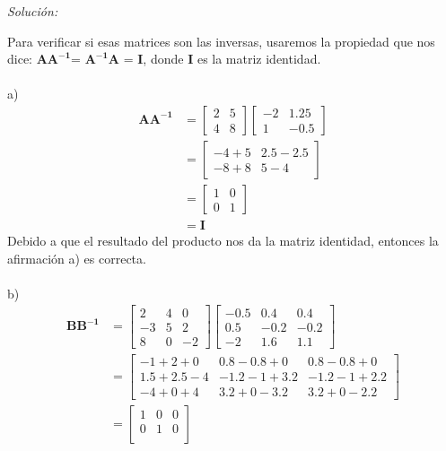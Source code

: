 \documentclass[12pt]{article}
\newenvironment{sol}
    {\emph{Solución:}
    }
    {
    }
\begin{document}
\begin{sol}
Para verificar si esas matrices son las inversas, usaremos la propiedad que nos dice:
$\mathbf{AA^{-1}}$= $\mathbf{A^{-1}A}$ = \textbf{I}, donde \textbf{I} es la matriz identidad.\\ \\
a) 
\begin{align*}
\mathbf{AA^{-1}} &= 
\begin{bmatrix} 
2 & 5 \\
4 & 8 
\end{bmatrix} 
\begin{bmatrix}
-2 & 1.25 \\ 
1 & -0.5
\end{bmatrix}\\
&= 
\begin{bmatrix}
-4 + 5 & 2.5 - 2.5 \\
-8 + 8 & 5 - 4
\end{bmatrix}\\
&= 
\begin{bmatrix}
1 & 0 \\
0 & 1
\end{bmatrix}\\
&= \mathbf{I}
\end{align*}
Debido a que el resultado del producto nos da la matriz identidad, entonces la afirmación a) es correcta. \\ \\ 
b)
\begin{align*}
\mathbf{BB^{-1}} &= 
\begin{bmatrix}
2&4&0\\
-3&5&2\\
8&0&-2
\end{bmatrix}
\begin{bmatrix}
-0.5 & 0.4 & 0.4\\
0.5 & -0.2 & -0.2\\
-2 & 1.6 & 1.1
\end{bmatrix} \\
&=
\begin{bmatrix}
-1 + 2 + 0 & 0.8 - 0.8 + 0 & 0.8 - 0.8 + 0 \\
1.5 + 2.5 - 4 & -1.2 - 1 + 3.2 & -1.2 - 1 + 2.2 \\
-4 + 0 + 4 & 3.2 + 0 - 3.2 & 3.2 + 0 - 2.2
\end{bmatrix}
\\ &=
\begin{bmatrix}
1 & 0 & 0 \\
0 & 1 & 0 \\

\end{bmatrix}
\end{align*}
\end{sol}
\end{document}
